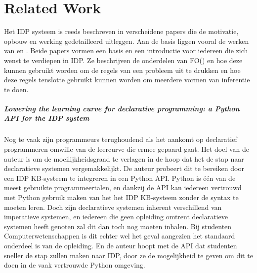 \chapter{Related Work}
\label{cha:relatedwork}

Het IDP systeem is reeds beschreven in verscheidene papers die de motivatie, opbouw en werking gedetailleerd uitleggen. Aan de basis liggen vooral de werken van \citep{de2014predicate} en \citep{de2014separating}. Beide papers vormen een basis en een introductie voor iedereen die zich wenst te verdiepen in IDP. Ze beschrijven de onderdelen van FO(\textperiodcentered) en hoe deze kunnen gebruikt worden om de regels van een probleem uit te drukken en hoe deze regels tenslotte gebruikt kunnen worden om meerdere vormen van inferentie te doen. 

\paragraph{Lowering the learning curve for declarative programming: a Python API for the IDP system \cite{vennekens2015lowering}}
Nog te vaak zijn programmeurs terughoudend als het aankomt op declaratief programmeren omwille van de leercurve die ermee gepaard gaat. Het doel van de auteur is om de moeilijkheidsgraad te verlagen in de hoop dat het de stap naar declaratieve systemen vergemakkelijkt. De auteur probeert dit te bereiken door een IDP KB-systeem te integreren in een Python API. Python is \'{e}\'{e}n van de meest gebruikte programmeertalen, en dankzij de API kan iedereen vertrouwd met Python gebruik maken van het het IDP KB-systeem zonder de syntax te moeten leren. Doch zijn declaratieve systemen inherent verschillend van imperatieve systemen, en iedereen die geen opleiding omtrent declaratieve systemen heeft genoten zal dit dan toch nog moeten inhalen. Bij studenten Computerwetenschappen is dit echter wel het geval aangezien het standaard onderdeel is van de opleiding. En de auteur hoopt met de API dat studenten sneller de stap zullen maken naar IDP, door ze de mogelijkheid te geven om dit te doen in de vaak vertrouwde Python omgeving.

